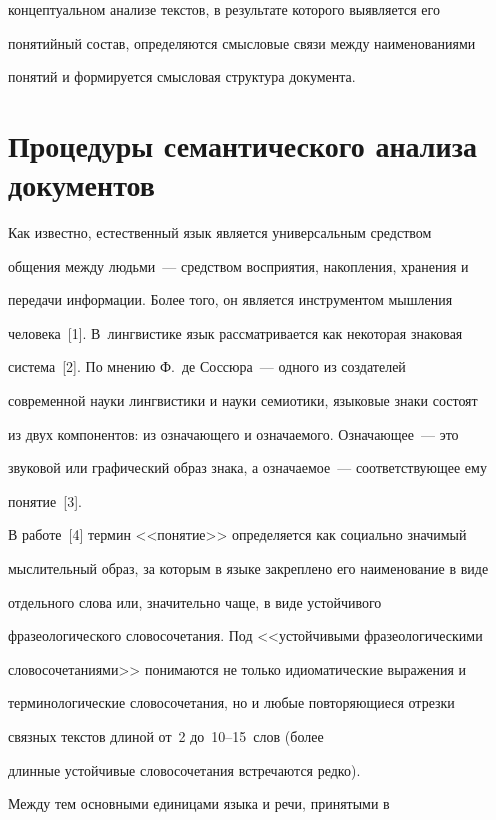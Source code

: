 концептуальном анализе текстов, в результате которого выявляется его 

понятийный состав, определяются смысловые связи между наименованиями 

понятий и формируется смысловая структура документа.

    

    \section{Процедуры семантического анализа документов}

     

     Как известно, естественный язык является универсальным средством 

общения между людьми~--- средством восприятия, накопления, хранения и 

передачи информации. Более того, он является инструментом мышления 

человека~[1]. В~лингвистике язык рассматривается как некоторая знаковая 

система~[2]. По мнению Ф.~де Сос\-сю\-ра~--- одного из создателей 

современной науки лингвистики и науки семиотики, языковые знаки состоят 

из двух компонентов: из озна\-ча\-юще\-го и озна\-ча\-емо\-го. Означающее~--- это 

звуковой или графический образ знака, а озна\-ча\-емое~--- соответствующее ему 

понятие~[3].

     

     В работе~[4] термин <<понятие>> определяется как социально значимый 

мыс\-ли\-тель\-ный образ, за которым в языке закреплено его наименование в виде 

отдельного слова или, значительно чаще, в виде устойчивого 

фразеологического словосочетания. Под <<устойчивыми фразеологическими 

словосочетаниями>> понимаются не только идиоматические выражения и 

терминологические словосочетания, но и любые повторяющиеся отрезки 

связных текстов длиной от~2 до~10--15~слов (более 

длинные устойчивые словосочетания встречаются редко).

     

     Между тем основными единицами языка и речи, принятыми в 

